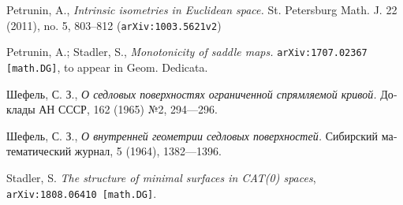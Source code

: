 \documentclass{article}
\begin{document}
\begin{thebibliography}{52}
 Petrunin, A.,
\textit{Intrinsic isometries in Euclidean space.}
St. Petersburg Math. J. 22 (2011), no. 5, 803--812 (\texttt{arXiv:1003.5621v2})

 Petrunin, A.; Stadler, S.,
\textit{Monotonicity of saddle maps.} 
\texttt{arXiv:1707.02367 [math.DG]}, to appear in Geom. Dedicata.





\begin{otherlanguage}{russian}
Шефель, С. З.,
\textit{О седловых поверхностях ограниченной спрямляемой кривой.}
Доклады АН СССР, 162 (1965) №2, 
294---296.
\end{otherlanguage}

\begin{otherlanguage}{russian}
Шефель, С. З., 
\textit{О внутренней геометрии седловых поверхностей.}
Сибирский математический журнал, 5 (1964), 1382---1396.
\end{otherlanguage}


 Stadler, S. \textit{The structure of minimal surfaces in CAT(0) spaces}, \texttt{arXiv:1808.06410 [math.DG]}.



   
  
\end{thebibliography}

\Addresses
\end{document}
